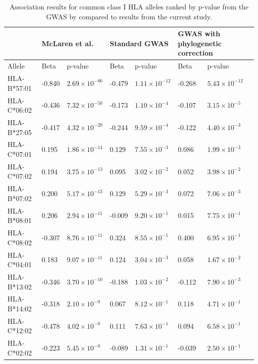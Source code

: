 \documentclass[]{article}
\begin{document}
\begin{longtable}[H]{lp{1cm}p{2cm}p{1cm}p{2cm}p{1cm}p{2cm}} %
		\caption{Association results for common class I HLA alleles ranked by p-value from the GWAS by \citet{McLaren2015} compared to results from the current study.}
		\hline
		& \multicolumn{2}{l}{McLaren et al.}  & \multicolumn{2}{l}{Standard GWAS} & \multicolumn{2}{l}{GWAS with phylogenetic correction} \\ 
		\hline
	 	Allele & Beta & p-value & Beta &p-value & Beta& p-value \\ 
		\hline
		HLA-B*57:01 & -0.840 & $2.69 \times 10^{-86}$ & -0.479 & $1.11 \times 10^{-12}$ & -0.268 & $5.43 \times 10^{-12}$ \\ 
		HLA-C*06:02 & -0.436 & $7.32 \times 10^{-50}$ & -0.173 & $1.10 \times 10^{-4}$ & -0.107 & $3.15 \times 10^{-5}$ \\ 
		HLA-B*27:05 & -0.417 & $4.32 \times 10^{-20}$ & -0.244 & $9.59 \times 10^{-4}$ & -0.122 & $4.40 \times 10^{-3}$ \\ 
		HLA-C*07:01 & 0.195 & $1.86 \times 10^{-14}$ & 0.129 & $7.55 \times 10^{-3}$ & 0.086 & $1.99 \times 10^{-3}$ \\ 
		HLA-C*07:02 & 0.194 & $3.75 \times 10^{-13}$ & 0.095 & $3.02 \times 10^{-2}$ & 0.052 & $3.98 \times 10^{-2}$ \\ 
		HLA-B*07:02 & 0.200 & $5.17 \times 10^{-13}$ & 0.129 & $5.29 \times 10^{-3}$ & 0.072 & $7.06 \times 10^{-3}$ \\ 
		HLA-B*08:01 & 0.206 & $2.94 \times 10^{-11}$ & -0.009 & $9.20 \times 10^{-1}$ & 0.015 & $7.75 \times 10^{-1}$ \\ 
		HLA-C*08:02 & -0.307 & $8.76 \times 10^{-11}$ & 0.324 & $8.55 \times 10^{-1}$ & 0.400 & $6.95 \times 10^{-1}$ \\ 
		HLA-C*04:01 & 0.183 & $9.07 \times 10^{-11}$ & 0.124 & $3.04 \times 10^{-3}$ & 0.058 & $1.67 \times 10^{-2}$ \\ 
		HLA-B*13:02 & -0.346 & $3.70 \times 10^{-10}$ & -0.188 & $1.03 \times 10^{-2}$ & -0.112 & $7.90 \times 10^{-3}$ \\ 
		HLA-B*14:02 & -0.318 & $2.10 \times 10^{-9}$ & 0.067 & $8.12 \times 10^{-1}$ & 0.118 & $4.71 \times 10^{-1}$ \\ 
		HLA-C*12:02 & -0.478 & $4.02 \times 10^{-8}$ & 0.111 & $7.63 \times 10^{-1}$ & 0.094 & $6.58 \times 10^{-1}$ \\ 
		HLA-C*02:02 & -0.223 & $5.45 \times 10^{-8}$ & -0.089 & $1.31 \times 10^{-1}$ & -0.039 & $2.50 \times 10^{-1}$ \\ 

\end{longtable}
\end{document}
